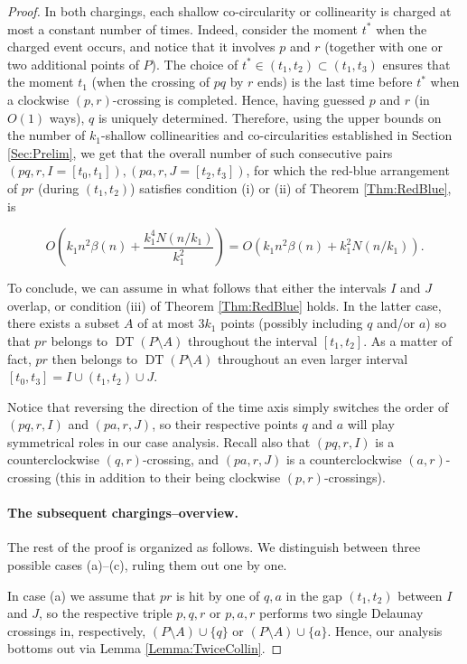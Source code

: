 \documentclass[letter,11pt]{article}
\def\DT{\mathop{\mathrm{DT}}}
\begin{document}
\begin{proof}
In both chargings, each shallow co-circularity or collinearity is charged at most a constant number of times. Indeed, consider the moment $t^*$ when the charged event occurs, and notice that it involves $p$ and $r$ (together with one or two additional points of $P$). The choice of $t^*\in (t_1,t_2)\subset (t_1,t_3)$ ensures that the moment $t_1$ (when the crossing of $pq$ by $r$ ends) is the last time before $t^*$ when a clockwise $(p,r)$-crossing is completed. Hence, having guessed $p$ and $r$ (in $O(1)$ ways), $q$ is uniquely determined.
Therefore, using the upper bounds on the number of $k_1$-shallow collinearities and co-circularities established in Section \ref{Sec:Prelim}, we get that the overall number of such consecutive pairs $(pq,r,I=[t_0,t_1]), (pa,r,J=[t_2,t_3])$, for which the red-blue arrangement of $pr$ (during $(t_1,t_2)$) satisfies condition (i) or (ii) of Theorem \ref{Thm:RedBlue}, is 

$$
O\left(k_1n^2\beta(n)+\frac{k_1^4N(n/k_1)}{k_1^2}\right)=O\left(k_1n^2\beta(n)+k_1^2N(n/k_1)\right).
$$



To conclude, we can assume in what follows that either the intervals $I$ and $J$ overlap, or condition (iii) of Theorem \ref{Thm:RedBlue} holds. In the latter case, there exists a subset $A$ of at most $3k_1$ points (possibly including $q$ and/or $a$) so that $pr$ belongs to $\DT(P\setminus A)$ throughout the interval $[t_1,t_2]$. As a matter of fact, $pr$ then belongs to $\DT(P\setminus A)$ throughout an even larger interval $[t_0,t_3]=I\cup (t_1,t_2)\cup J$. 


Notice that reversing the direction of the time axis simply switches the order of $(pq,r,I)$ and $(pa,r,J)$, so their respective points $q$ and $a$ will play symmetrical roles in our case analysis. Recall also that $(pq,r,I)$ is a counterclockwise $(q,r)$-crossing, and $(pa,r,J)$ is a counterclockwise $(a,r)$-crossing (this in addition to their being clockwise $(p,r)$-crossings).

\paragraph{The subsequent chargings--overview.} The rest of the proof is organized as follows.
We distinguish between three possible cases (a)--(c), ruling them out one by one.

In case (a) we assume that $pr$ is hit by one of $q,a$ in the gap $(t_1,t_2)$ between $I$ and $J$, so the respective triple $p,q,r$ or $p,a,r$ performs two single Delaunay crossings in, respectively, $(P\setminus A)\cup \{q\}$ or $(P\setminus A)\cup \{a\}$. Hence, our analysis bottoms out via Lemma \ref{Lemma:TwiceCollin}.



\end{proof}
\end{document}
